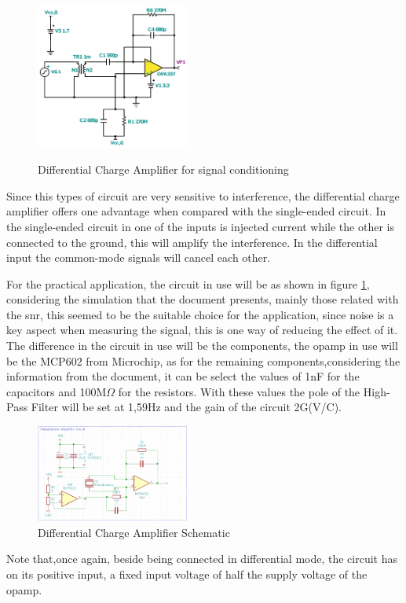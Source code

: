 \begin{figure}[]
    \centering
    \includegraphics[width=0.45\textwidth]{Chapters/4CHP/Figures/differentialchargeamp.pdf}
    \caption{Differential Charge Amplifier for signal conditioning}{\cite{bartolomeSignalConditioningPiezoelectric2010}}
    \label{fig:ChargeAmpDif}
\end{figure}

Since this types of circuit are very sensitive to interference, the differential charge amplifier offers one advantage when compared with the single-ended circuit. In the single-ended circuit in one of the inputs is injected current while the other is connected to the ground, this will amplify the interference. In the differential input the common-mode signals will cancel each other.

For the practical application, the  circuit in use will be as shown in figure \ref{fig:ChargeAmpDif}, considering the simulation that the document \cite{bartolomeSignalConditioningPiezoelectric2010} presents, mainly those related with the \acrshort{snr}, this seemed to be the suitable choice for the application, since noise is a key aspect when measuring the signal, this is one way of reducing the effect of it. The difference in the circuit in use will be the components, the \acrshort{opamp} in use will be the MCP602 from Microchip, as for the remaining components,considering the information from the document, it can be select the values of 1nF for the capacitors and 100M$\Omega$ for the resistors. With these values the pole of the High-Pass Filter will be set at 1,59Hz and the gain of the circuit 2G(V/C).
\begin{figure}[]
    \centering
    \includegraphics[width=0.45\textwidth]{Chapters/4CHP/Figures/piezoAmpcirc.PNG}
    \caption{Differential Charge Amplifier Schematic}
    \label{fig:ChargeAmpDifSCH}
\end{figure}
Note that,once again, beside being connected in differential mode, the circuit has on its positive input, a fixed input voltage of half the supply voltage of the \acrshort{opamp}.
